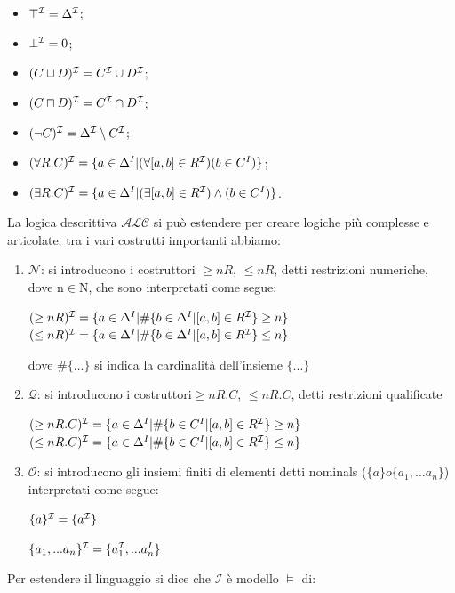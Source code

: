 \documentclass[a4paper,11pt]{article}
\newcommand{\alc}{%
   \ensuremath{\mathcal{ALC}}\xspace}
\newcommand{\I}{%
        \ensuremath{\mathcal{I}}\xspace}
\newcommand{\Q}{%
  \ensuremath{\mathcal{Q}}\xspace}
\newcommand{\N}{%
  \ensuremath{\mathcal{N}}\xspace}
\newcommand{\Onom}{%
  \ensuremath{\mathcal{O}}\xspace}
\begin{document}
\begin{itemize}
\item $\top^{\I}=\Delta^\I$;
\item $\bot^{\I}=0$;
\item $(C \sqcup  D)^{\I}=C^{\I} \cup D^{\I}$;
\item $(C \sqcap  D)^{\I}=C^{\I} \cap D^{\I}$;
\item $(\neg C)^{\I}=\Delta^{\I} \setminus C^{\I}$;
\item $(\forall R.C)^{\I}=\{a \in \Delta^{I} | (\forall[a,b] \in R^{\I}) (b \in C^{I})\}$;
\item $(\exists R.C)^{\I}=\{a \in \Delta^{I} | (\exists[a,b] \in R^{\I})\wedge (b \in C^{I})\}$.
\end{itemize} La logica descrittiva $\alc$ si può estendere per creare logiche più complesse e articolate; tra i vari costrutti importanti abbiamo:
\begin{enumerate}
\item $\N$: si introducono i costruttori $\geq nR$, $\leq nR$, detti restrizioni numeriche, dove n$\in$N, che sono interpretati come segue:
\begin{center}
		$(\geq nR)^{\I}=\{a \in \Delta^{I}|\#\{b \in \Delta^{I} |[a,b] \in R^{\I}\}\geq n\}$\newline$(\leq nR)^{\I}=\{a \in \Delta^{I}|\#\{b \in \Delta^{I} |[a,b] \in R^{\I}\}\leq n\}$\newline
\end{center} dove $\#\{...\}$ si indica la cardinalità dell'insieme $\{...\}$
\item $\Q$: si introducono i costruttori$\geq nR.C$, $\leq nR.C$, detti restrizioni qualificate
\begin{center}
$(\geq nR.C)^{\I}=\{a \in \Delta^{I}|\#\{b \in C^{I} |[a,b] \in R^{\I}\}\geq n\}$ $(\leq nR.C)^{\I}=\{a \in \Delta^{I}|\#\{b \in C^{I} |[a,b] \in R^{\I}\}\leq n\}$
\end{center}
\item $\Onom$: si introducono gli insiemi finiti di elementi 
detti nominals ($\{a\} o \{a_1,...a_n\} $) interpretati come segue:
\begin{center}
$\{a\}^{\I}=\{a^{\I}\}$
\end{center}
\begin{center}
$\{a_1,...a_n\}^{\I}=\{a_1^{\I},...a_n^{I}\}$
\end{center}
\end{enumerate}
Per estendere il linguaggio si dice che $\I$ è modello $\models$ di:\newline
\end{document}

